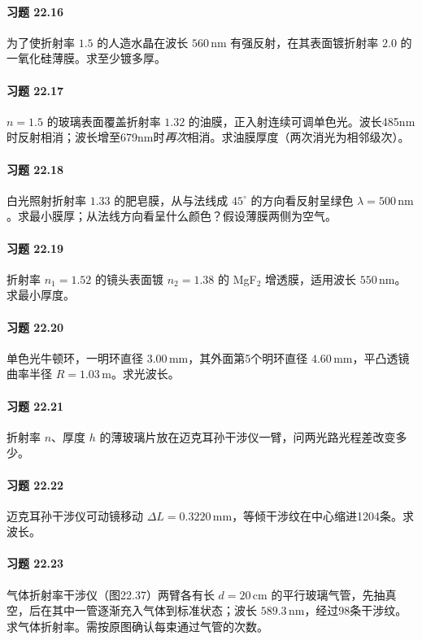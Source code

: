 \paragraph{习题 22.16}
为了使折射率 \(1.5\) 的人造水晶在波长 \(560\,\mathrm{nm}\) 有强反射，在其表面镀折射率 \(2.0\) 的一氧化硅薄膜。求至少镀多厚。
\paragraph{习题 22.17}
\(n=1.5\) 的玻璃表面覆盖折射率 \(1.32\) 的油膜，正入射连续可调单色光。波长485nm时反射相消；波长增至679nm时\emph{再次}相消。求油膜厚度（两次消光为相邻级次）。
\paragraph{习题 22.18}
白光照射折射率 \(1.33\) 的肥皂膜，从与法线成 \(45^\circ\) 的方向看反射呈绿色 \(\lambda=500\,\mathrm{nm}\)。求最小膜厚；从法线方向看呈什么颜色？假设薄膜两侧为空气。
\paragraph{习题 22.19}
折射率 \(n_1=1.52\) 的镜头表面镀 \(n_2=1.38\) 的 MgF\(_2\) 增透膜，适用波长 \(550\,\mathrm{nm}\)。求最小厚度。
\paragraph{习题 22.20}
单色光牛顿环，一明环直径 \(3.00\,\mathrm{mm}\)，其外面第5个明环直径 \(4.60\,\mathrm{mm}\)，平凸透镜曲率半径 \(R=1.03\,\mathrm m\)。求光波长。
\paragraph{习题 22.21}
折射率 \(n\)、厚度 \(h\) 的薄玻璃片放在迈克耳孙干涉仪一臂，问两光路光程差改变多少。
\paragraph{习题 22.22}
迈克耳孙干涉仪可动镜移动 \(\Delta L=0.3220\,\mathrm{mm}\)，等倾干涉纹在中心缩进1204条。求波长。
\paragraph{习题 22.23}
气体折射率干涉仪（图22.37）两臂各有长 \(d=20\,\mathrm{cm}\) 的平行玻璃气管，先抽真空，后在其中一管逐渐充入气体到标准状态；波长 \(589.3\,\mathrm{nm}\)，经过98条干涉纹。求气体折射率。需按原图确认每束通过气管的次数。
